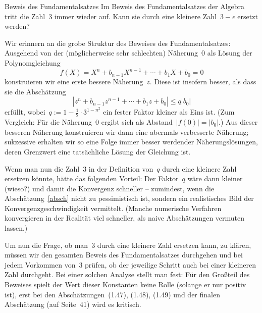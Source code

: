 \documentclass{algblatt}
\begin{document}
\begin{aufgabe}{Beweis des Fundamentalsatzes}
Im Beweis des Fundamentalsatzes der Algebra tritt die Zahl~3 immer wieder auf.
Kann sie durch eine kleinere Zahl~$3-\epsilon$ ersetzt werden?
\begin{loesung}
Wir erinnern an die grobe Struktur des Beweises des Fundamentalsatzes:
Ausgehend von der (möglicherweise sehr schlechten) Näherung~$0$ als Lösung der
Polynomgleichung
\[ f(X) = X^n + b_{n-1}X^{n-1} + \cdots + b_1 X + b_0 = 0 \]
konstruieren wir eine erste bessere Näherung~$z$. Diese ist insofern besser,
als dass sie die Abschätzung
\begin{equation}\label{absch}
  |z^n + b_{n-1}z^{n-1} + \cdots + b_1 z + b_0| \leq q |b_0|
\end{equation}
erfüllt, wobei~$q := 1 - \frac{1}{2} \cdot 3^{1 - n^2}$ ein fester Faktor
kleiner als Eins ist. (Zum Vergleich: Für die Näherung~$0$ ergibt sich als
Abstand~$|f(0)| = |b_0|$.) Aus dieser besseren Näherung konstruieren wir dann
eine abermals verbesserte Näherung; sukzessive erhalten wir so eine Folge immer
besser werdender Näherungslösungen, deren Grenzwert eine tatsächliche Lösung
der Gleichung ist.

Wenn man nun die Zahl~$3$ in der Definition von~$q$ durch eine kleinere Zahl
ersetzen könnte, hätte das folgenden Vorteil: Der Faktor~$q$ wäre dann kleiner
(wieso?) und damit die Konvergenz schneller -- zumindest, wenn die
Abschätzung~\eqref{absch} nicht zu pessimistisch ist, sondern ein realistisches
Bild der Konvergenzgeschwindigkeit vermittelt. (Manche numerische Verfahren
konvergieren in der Realität viel schneller, als naive Abschätzungen vermuten
lassen.)

Um nun die Frage, ob man~$3$ durch eine kleinere Zahl ersetzen kann, zu klären,
müssen wir den gesamten Beweis des Fundamentalsatzes durchgehen und bei jedem
Vorkommen von~$3$ prüfen, ob der jeweilige Schritt auch bei einer kleineren
Zahl durchgeht. Bei einer solchen Analyse stellt man fest: Für den Großteil des
Beweises spielt der Wert dieser Konstanten keine Rolle (solange er nur positiv
ist), erst bei den Abschätzungen~(1.47), (1.48), (1.49) und der finalen
Abschätzung (auf Seite~41) wird es kritisch.


\end{loesung}
\end{aufgabe}
\end{document}
